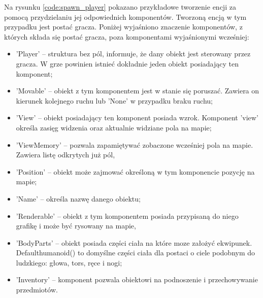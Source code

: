 \documentclass[12pt,twoside]{article}
\begin{document}
Na rysunku \ref{code:spawn_player} pokazano przykładowe tworzenie encji za pomocą przydzielaniu jej odpowiednich komponentów. Tworzoną encją w tym przypadku jest postać gracza. Poniżej wyjaśniono znaczenie komponentów, z których składa się postać gracza, poza komponentami wyjaśnionymi wcześniej:
\begin{itemize}	
	\item 'Player' -- struktura bez pól, informuje, że dany obiekt jest sterowany przez gracza. W grze powinien istnieć dokładnie jeden obiekt posiadający ten komponent;
	\item 'Movable' -- obiekt z tym komponentem jest w stanie się poruszać. Zawiera on kierunek kolejnego ruchu lub 'None' w przypadku braku ruchu;
	\item 'View' -- obiekt posiadający ten komponent posiada wzrok. Komponent 'view' określa zasięg widzenia oraz aktualnie widziane pola na mapie;
	\item 'ViewMemory' -- pozwala zapamiętywać zobaczone wcześniej pola na mapie. Zawiera listę odkrytych już pól,
	\item 'Position' -- obiekt może zajmować określoną w tym komponencie pozycję na mapie;
	\item 'Name' -- określa nazwę danego obiektu;
	\item 'Renderable' -- obiekt z tym komponentem posiada przypisaną do niego grafikę i może być rysowany na mapie,
	\item 'BodyParts' -- obiekt posiada części ciała na które moze założyć ekwipunek. Default\-humanoid() to domyślne części ciała dla postaci o ciele podobnym do ludzkiego: głowa, tors, ręce i nogi;
	\item 'Inventory' -- komponent pozwala obiektowi na podnoszenie i przechowywanie przedmiotów.
\end{itemize}
\end{document}
